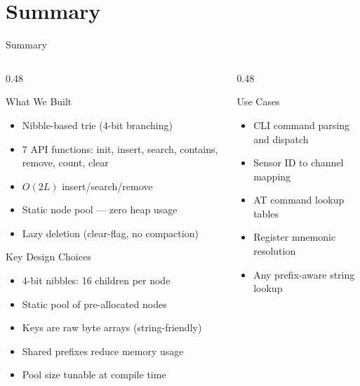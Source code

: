 \documentclass[aspectratio=169, 10pt]{beamer}
\begin{document}
\section{Summary}

\begin{frame}{Summary}
\begin{columns}[T]
\begin{column}{0.48\textwidth}
\begin{block}{What We Built}
\begin{itemize}
  \item Nibble-based trie (4-bit branching)
  \item 7 API functions: init, insert, search, contains, remove, count, clear
  \item $O(2L)$ insert/search/remove
  \item Static node pool --- zero heap usage
  \item Lazy deletion (clear-flag, no compaction)
\end{itemize}
\end{block}

\begin{block}{Key Design Choices}
\begin{itemize}
  \item 4-bit nibbles: 16 children per node
  \item Static pool of pre-allocated nodes
  \item Keys are raw byte arrays (string-friendly)
  \item Shared prefixes reduce memory usage
  \item Pool size tunable at compile time
\end{itemize}
\end{block}
\end{column}

\begin{column}{0.48\textwidth}
\begin{block}{Use Cases}
\begin{itemize}
  \item CLI command parsing and dispatch
  \item Sensor ID to channel mapping
  \item AT command lookup tables
  \item Register mnemonic resolution
  \item Any prefix-aware string lookup
\end{itemize}
\end{block}


\end{column}
\end{columns}
\end{frame}
\end{document}
